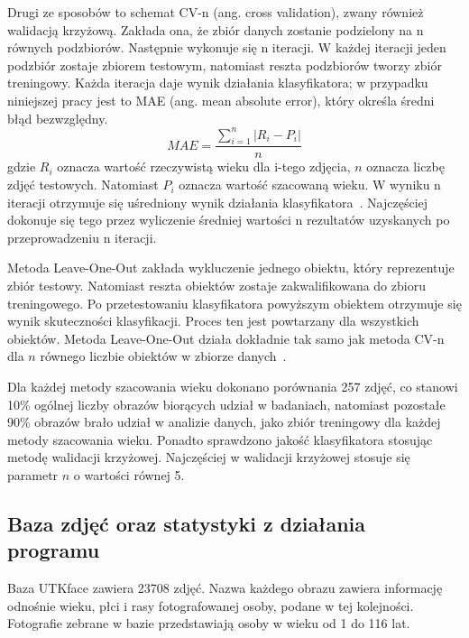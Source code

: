 \documentclass[a4paper,twoside,12pt]{book}
\begin{document}
    Drugi ze sposobów to schemat CV-n (ang. cross validation), zwany również walidacją krzyżową.
    Zakłada ona, że zbiór danych zostanie podzielony na n równych podzbiorów.
    Następnie wykonuje się n iteracji. W każdej iteracji jeden podzbiór zostaje zbiorem testowym, natomiast reszta
    podzbiorów tworzy zbiór treningowy.
    Każda iteracja daje wynik działania klasyfikatora; w przypadku niniejszej pracy jest to
    MAE (ang. mean absolute error), który określa średni błąd bezwzględny.
    \large
    \begin{equation}
        MAE = \frac{\sum_{i=1}^{n}\left | R_{i}-P_{i} \right |}{n}
        \label{wzor.mae}
    \end{equation}
    \normalsize
    gdzie $R_{i}$ oznacza wartość rzeczywistą wieku dla i-tego zdjęcia, $n$ oznacza liczbę zdjęć testowych.
    Natomiast $P_{i}$ oznacza wartość szacowaną wieku.
    W wyniku n iteracji otrzymuje się uśredniony wynik działania klasyfikatora~\cite{dataMiningAlgorithms}.
    Najczęściej dokonuje się tego przez wyliczenie średniej wartości n rezultatów uzyskanych po przeprowadzeniu
    n iteracji.

    Metoda Leave-One-Out zakłada wykluczenie jednego obiektu, który reprezentuje zbiór testowy. Natomiast reszta obiektów zostaje zakwalifikowana do zbioru treningowego.
    Po przetestowaniu klasyfikatora powyższym obiektem otrzymuje się wynik skuteczności klasyfikacji. Proces ten jest powtarzany dla wszystkich obiektów.
    Metoda Leave-One-Out działa dokładnie tak samo jak metoda CV-n dla $n$ równego liczbie obiektów
    w zbiorze danych~\cite{dataMiningAlgorithms}.

    Dla każdej metody szacowania wieku dokonano porównania 257 zdjęć, co stanowi 10\% ogólnej liczby obrazów biorących
    udział w
    badaniach, natomiast pozostałe 90\% obrazów brało udział w analizie danych, jako zbiór treningowy dla każdej metody
    szacowania wieku.
    Ponadto sprawdzono jakość klasyfikatora stosując metodę walidacji krzyżowej. Najczęściej w walidacji krzyżowej
    stosuje się parametr $n$ o wartości równej 5.

    \subsection*{Baza zdjęć oraz statystyki z działania programu}
    Baza UTKface zawiera 23708 zdjęć.
    Nazwa każdego obrazu zawiera informację odnośnie wieku, płci i rasy fotografowanej osoby, podane w tej kolejności.
    Fotografie zebrane w bazie przedstawiają osoby w wieku od 1 do 116 lat.
\end{document}
